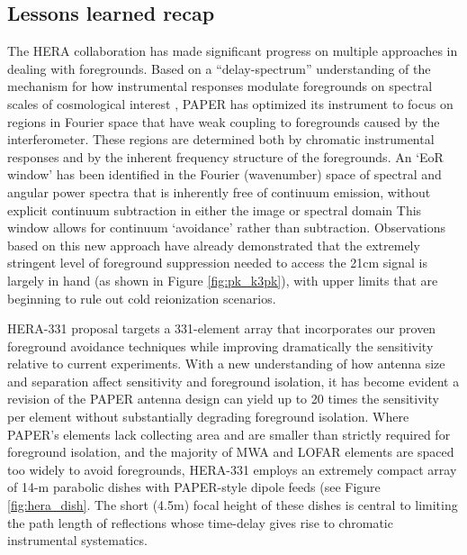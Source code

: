 \documentclass[preprint]{aastex}
\begin{document}
\subsection{Lessons learned recap} %
The HERA collaboration has made significant progress on multiple approaches in dealing with
foregrounds.
Based on a ``delay-spectrum'' understanding of
the mechanism for how instrumental responses modulate foregrounds on
spectral scales of cosmological interest \citep{parsons_et_al2012b},
PAPER has optimized its instrument to focus on regions in Fourier
space that have weak coupling to foregrounds caused by the
interferometer.  These regions are determined both by chromatic
instrumental responses and by the inherent frequency structure of the
foregrounds.  An `EoR window' has been identified in the Fourier
(wavenumber) space of spectral and angular power spectra that is
inherently free of continuum emission, without explicit continuum
subtraction in either the image or spectral domain \citep{pober_et_al2013,morales_et_al2012,Datta_2010}
This window allows for continuum
`avoidance' rather than subtraction. Observations based on this new
approach have already demonstrated that the extremely stringent level
of foreground suppression needed to access the 21cm signal is largely
in hand (as shown in Figure \ref{fig:pk_k3pk}), with upper limits
that are beginning to rule out cold reionization scenarios.

HERA-331 proposal targets a 331-element array that incorporates
our proven foreground avoidance techniques while improving
dramatically the sensitivity relative to current experiments.  With a
new understanding of how antenna size and separation affect
sensitivity and foreground isolation, it has become evident a revision
of the PAPER antenna design can yield up to 20 times the sensitivity
per element without substantially degrading foreground isolation.
Where PAPER's elements lack collecting area and are smaller than
strictly required for foreground isolation, and the majority of MWA
and LOFAR elements are spaced too widely to avoid foregrounds,
HERA-331 employs an extremely compact array of 14-m parabolic dishes
with PAPER-style dipole feeds (see Figure \ref{fig:hera_dish}.  The
short (4.5m) focal height of these dishes is central to limiting the
path length of reflections whose time-delay gives rise to chromatic
instrumental systematics.
\end{document}
